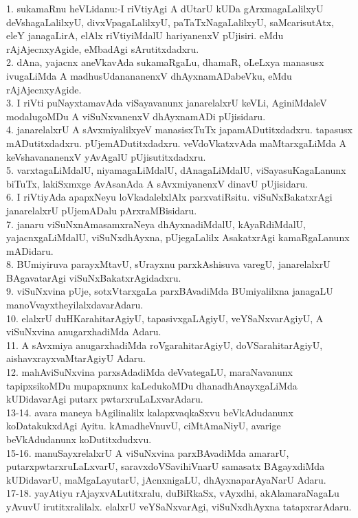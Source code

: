\documentclass{article}
\begin{document}
1. sukamaRnu heVLidanu:-I riVtiyAgi A dUtarU kUDa gArxmagaLalilxyU deVshagaLalilxyU, divxVpagaLalilxyU, paTaTxNagaLalilxyU, saMcarisutAtx, eleY janagaLirA, elAlx riVtiyiMdalU hariyanenxV pUjisiri. eMdu rAjAjecnxyAgide, eMbadAgi sArutitxdadxru.\\
2. dAna, yajacnx aneVkavAda sukamaRgaLu, dhamaR, oLeLxya manasusx ivugaLiMda A madhusUdanananenxV dhAyxnamADabeVku, eMdu rAjAjecnxyAgide.\\
3. I riVti puNayxtamavAda viSayavanunx janarelalxrU keVLi, AginiMdaleV modalugoMDu A viSuNxvanenxV dhAyxnamADi pUjisidaru.\\
4. janarelalxrU A sAvxmiyalilxyeV manasisxTuTx japamADutitxdadxru. tapasusx mADutitxdadxru. pUjemADutitxdadxru. veVdoVkatxvAda maMtarxgaLiMda A keVshavananenxV yAvAgalU pUjisutitxdadxru.\\
5. varxtagaLiMdalU, niyamagaLiMdalU, dAnagaLiMdalU, viSayasuKagaLanunx biTuTx, lakiSxmxge AvAsanAda A sAvxmiyanenxV dinavU pUjisidaru.\\
6. I riVtiyAda apapxNeyu loVkadalelxlAlx parxvatiRsitu. viSuNxBakatxrAgi janarelalxrU pUjemADalu pArxraMBisidaru.\\
7. janaru viSuNxnAmasamxraNeya dhAyxnadiMdalU, kAyaRdiMdalU, yajacnxgaLiMdalU, viSuNxdhAyxna, pUjegaLalilx AsakatxrAgi kamaRgaLanunx mADidaru.\\
8. BUmiyiruva parayxMtavU, sUrayxnu parxkAshisuva varegU, janarelalxrU BAgavatarAgi viSuNxBakatxrAgidadxru.\\
9. viSuNxvina pUje, sotxVtarxgaLa parxBAvadiMda BUmiyalilxna janagaLU manoVvayxtheyilalxdavarAdaru.\\
10. elalxrU duHKarahitarAgiyU, tapasivxgaLAgiyU, veYSaNxvarAgiyU, A viSuNxvina anugarxhadiMda Adaru.\\
11. A sAvxmiya anugarxhadiMda roVgarahitarAgiyU, doVSarahitarAgiyU, aishavxrayxvaMtarAgiyU Adaru.\\
12. mahAviSuNxvina parxsAdadiMda deVvategaLU, maraNavanunx tapipxsikoMDu mupapxnunx kaLedukoMDu dhanadhAnayxgaLiMda kUDidavarAgi putarx pwtarxruLaLxvarAdaru.\\
13-14. avara maneya bAgilinalilx kalapxvaqkaSxvu beVkAdudanunx koDatakukxdAgi Ayitu. kAmadheVnuvU, ciMtAmaNiyU, avarige beVkAdudanunx koDutitxdudxvu.\\
15-16. manuSayxrelalxrU A viSuNxvina parxBAvadiMda amararU, putarxpwtarxruLaLxvarU, saravxdoVSavihiVnarU samasatx BAgayxdiMda kUDidavarU, maMgaLayutarU, jAcnxnigaLU, dhAyxnaparAyaNarU Adaru.\\
17-18. yayAtiyu rAjayxvALutitxralu, duBiRkaSx, vAyxdhi, akAlamaraNagaLu yAvuvU irutitxralilalx. elalxrU veYSaNxvarAgi, viSuNxdhAyxna tatapxrarAdaru.\\
\end{document}
